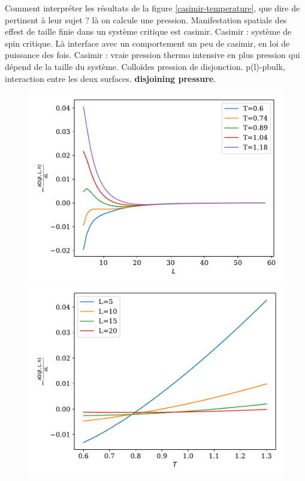 {\color{red} Comment interpréter les résultats de la figure \ref{casimir-temperature}, que dire de pertinent à leur sujet ? }
{\color{red} là on calcule une pression. Manifestation spatiale des effest de taille finie dans un système critique est casimir. 
Casimir : système de spin critique.
Là interface avec un comportement un peu de casimir, en loi de puissance des fois.
Casimir : vraie pression thermo intensive en plus pression qui dépend de la taille du système.
Colloïdes pression de disjonction. p(l)-pbulk, interaction entre les deux surfaces. \textbf{disjoining pressure}.}
\begin{figure}[t]
	\begin{minipage}[t]{0.4\linewidth}
		\includegraphics[width=\linewidth]{chap4/casimir-distance-mu001.pdf}
	\end{minipage}%
	\begin{minipage}[t]{0.4\linewidth}
		\includegraphics[width=\linewidth]{chap4/casimir-temperature-mu001.pdf}

\end{minipage}
\end{figure}
